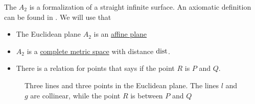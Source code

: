 \begin{definition}\label{def:euclidean_plane}
  The  \( A_2 \) is a formalization of a straight infinite surface. An axiomatic definition can be found in \cite{nLab:euclidean_geometry}. We will use that
  \begin{itemize}
    \item The Euclidean plane \( A_2 \) is an \hyperref[def:affine_plane]{affine plane}
    \item \( A_2 \) is a \hyperref[def:complete_metric_space]{complete metric space} with distance \( \operatorname{dist} \).
    \item There is a  relation for points that says if the point \( R \) is  \( P \) and \( Q \).
  \end{itemize}

  \begin{figure}[!ht]
    \centering
    \iffalse\begin{mplibcode}
      input metapost/plotting;

      u := 1.5cm;

      beginfig(1);
      path l, g, h, P, Q, R;
      l = (0, -1) * u -- (3, 0) * u;
      draw l;
      label.top("$l$", midpoint of l);

      g = (0, -2) * u -- (3, -1) * u;
      draw g;
      label.bot("$g$", midpoint of g);

      h = (0, 0) * u -- (3, -2) * u;
      draw h;
      label.urt("$h$", midpoint of h);

      P = dot shifted point 0.2 of h;
      fill P;
      label.llft("$P$", midpoint of P);

      Q = dot shifted point 0.8 of h;
      fill Q;
      label.llft("$Q$", midpoint of Q);

      R = dot shifted point 0.4 of h;
      fill R;
      label.llft("$R$", midpoint of R);
      endfig;
    \end{mplibcode}\fi
    \caption{Three lines and three points in the Euclidean plane. The lines \( l \) and \( g \) are collinear, while the point \( R \) is between \( P \) and \( Q \)}\label{def:affine_plane/figure}
  \end{figure}
\end{definition}

